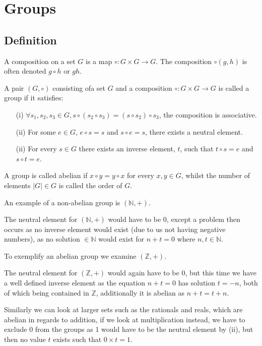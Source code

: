 \section{Groups}
\subsection{Definition}
A composition on a set $G$ is a map $\circ:G\times G\rightarrow G$. The composition $\circ(g,h)$ is often denoted $g\circ h$ or $gh$.
\begin{defi}[Group]
    A pair $(G,\circ)$ consisting ofa set $G$ and a composition $\circ:G\times G\rightarrow G$ is called a group if it satisfies:
    \begin{itemize}
        \item[(i)] $\forall s_{1},s_{2},s_{3}\in G,s\circ(s_{2}\circ s_{3})=(s\circ s_{2})\circ s_{3}$, the composition is associative.
        \item[(ii)] For some $e\in G$, $e\circ s=s$ and $s\circ e=s$, there exists a neutral element.
        \item[(ii)] For every $s\in G$ there exists an inverse element, $t$, such that $t\circ s=e$ and $s\circ t=e$.
    \end{itemize}
    A group is called abelian if $x\circ y=y\circ x$ for every $x,y\in G$, whilst the number of elements $|G|\in G$ is called the order of $G$.
\end{defi}
An example of a non-abelian group is $(\mathbb{N},+)$.
\begin{exmp}
    The neutral element for $(\mathbb{N},+)$ would have to be 0, except a problem then occurs as no inverse element would exist (due to us not having negative numbers), as no solution $\in\mathbb{N}$ would exist for $n+t=0$ where $n,t\in\mathbb{N}$.
\end{exmp} 
To exemplify an abelian group we examine $(\mathbb{Z},+)$.
\begin{exmp}
    The neutral element for $(\mathbb{Z},+)$ would again have to be 0, but this time we have a well defined inverse element as the equation $n+t=0$ has solution $t=-n$, both of which being contained in $\mathbb{Z}$, additionally it is abelian as $n+t=t+n$.
\end{exmp} 
Similarly we can look at larger sets such as the rationals and reals, which are abelian in regards to addition, if we look at multiplication instead, we have to exclude 0 from the groups as 1 would have to be the neutral element by (ii), but then no value $t$ exists such that $0\times t=1$.
